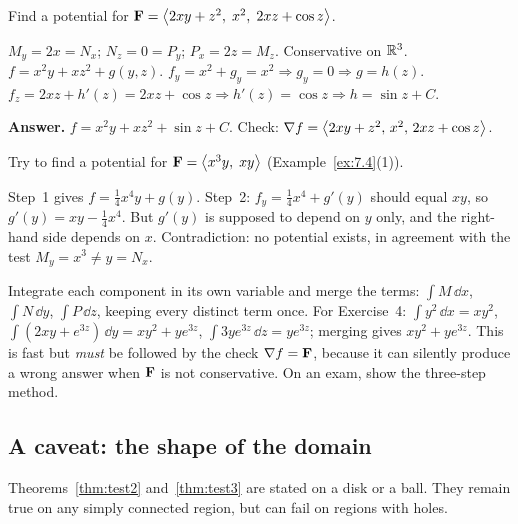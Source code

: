 \begin{example}\label{ex:pot3d}
Find a potential for $\mathbf{F}=\left\langle 2xy+z^2,\;x^2,\;2xz+\cos z \right\rangle$.
\end{example}
\begin{solution}
 $M_y=2x=N_x$; $N_z=0=P_y$; $P_x=2z=M_z$. Conservative on $\mathbb{R}^3$.
 $f=x^2y+xz^2+g(y,z)$.
 $f_y=x^2+g_y=x^2\Rightarrow g_y=0\Rightarrow g=h(z)$.
 $f_z=2xz+h'(z)=2xz+\cos z\Rightarrow h'(z)=\cos z\Rightarrow h=\sin z+C$.

\textbf{Answer.} $f=x^2y+xz^2+\sin z+C$. Check: $\nabla f=\left\langle 2xy+z^2,\,x^2,\,2xz+\cos z \right\rangle$.\checkok
\end{solution}

\begin{example}\label{ex:not-cons}
Try to find a potential for $\mathbf{F}=\left\langle x^3y,\;xy \right\rangle$ (Example~\ref{ex:7.4}(1)).
\end{example}
\begin{solution}
Step~1 gives $f=\frac14x^4y+g(y)$. Step~2: $f_y=\frac14x^4+g'(y)$ should equal $xy$, so
$g'(y)=xy-\frac14x^4$. But $g'(y)$ is supposed to depend on $y$ only, and the
right-hand side depends on $x$. Contradiction: no potential exists, in
agreement with the test $M_y=x^3\neq y=N_x$.
\end{solution}

\begin{remark}
Integrate each component in its own variable and merge the terms:
$\int M\,\dd x$, $\int N\,\dd y$, $\int P\,\dd z$, keeping every distinct term
once. For Exercise~4: $\int y^2\,\dd x=xy^2$, $\int(2xy+e^{3z})\,\dd y=xy^2+ye^{3z}$,
$\int3ye^{3z}\,\dd z=ye^{3z}$; merging gives $xy^2+ye^{3z}$. This is fast but
\emph{must} be followed by the check $\nabla f=\mathbf{F}$, because it can silently
produce a wrong answer when $\mathbf{F}$ is not conservative. On an exam, show the
three-step method.
\end{remark}

\subsection{A caveat: the shape of the domain}\label{sec:caveat}

Theorems~\ref{thm:test2} and~\ref{thm:test3} are stated on a disk or a ball.
They remain true on any simply connected region, but can fail on regions with
holes.

